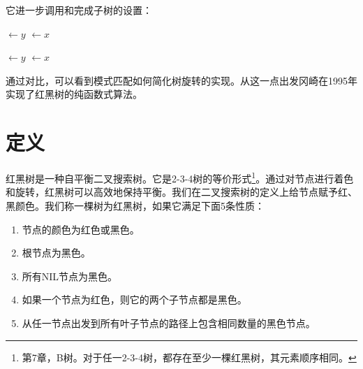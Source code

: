 \documentclass[b5paper]{ctexart}
\begin{document}
它进一步调用和完成子树的设置：

\begin{algorithmic}[1]
  \State {} $\gets y$
     $\gets x$
  \EndIf
  \EndFunction

\Statex

  \State {} $\gets y$
     $\gets x$
  \EndIf
\EndFunction
\end{algorithmic}

通过对比，可以看到模式匹配如何简化树旋转的实现。从这一点出发冈崎在1995年实现了红黑树的纯函数式算法\cite{okasaki}。

\begin{Exercise}\label{ex:rbt-right-rotate}
\end{Exercise}

\begin{Answer}[ref = {ex:rbt-right-rotate}]
\end{Answer}

\section{定义}

红黑树是一种自平衡二叉搜索树\cite{wiki-rbt}。它是2-3-4树的等价形式\footnote{第7章，B树。对于任一2-3-4树，都存在至少一棵红黑树，其元素顺序相同。}。通过对节点进行着色和旋转，红黑树可以高效地保持平衡。我们在二叉搜索树的定义上给节点赋予红、黑颜色。我们称一棵树为红黑树，如果它满足下面5条性质\cite{CLRS}：

\begin{enumerate}
\item 节点的颜色为红色或黑色。
\item 根节点为黑色。
\item 所有NIL节点为黑色。
\item 如果一个节点为红色，则它的两个子节点都是黑色。
\item 从任一节点出发到所有叶子节点的路径上包含相同数量的黑色节点。
\end{enumerate}
\end{document}
